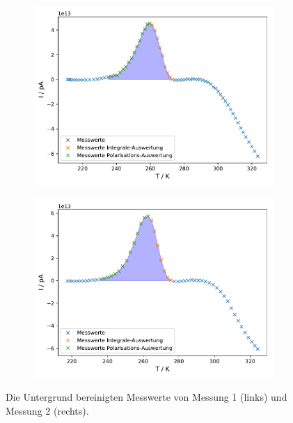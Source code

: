\begin{figure}
    \centering
    \begin{subfigure}[b]{0.49\textwidth}
        \centering
        \includegraphics[width= \textwidth]{plots/ohneunter_1.5grad.pdf}
    \end{subfigure}
    \hfill
    \begin{subfigure}[b]{0.49\textwidth}
        \centering
        \includegraphics[width= \textwidth]{plots/ohneunter_2grad.pdf}
    \end{subfigure}
    \caption{Die Untergrund bereinigten Messwerte von Messung 1 (links) und Messung 2 (rechts).}
    \label{fig:2}
\end{figure}





